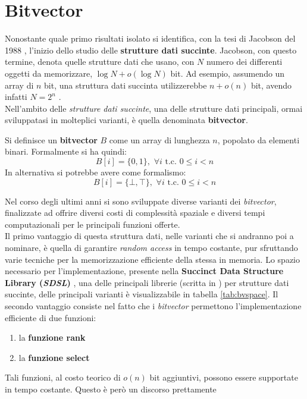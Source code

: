 \section{Bitvector}
\label{bvsec}
Nonostante quale primo risultati isolato si identifica, con la tesi di Jacobson
del 1988 \cite{succinct}, l'inizio dello studio delle \textbf{strutture dati
  succinte}. Jacobson, con questo termine, denota quelle strutture dati che
usano, con $N$ numero dei differenti oggetti da memorizzare, $\log N+o(\log N)$
bit. Ad esempio, assumendo un array di $n$ bit, una struttura dati succinta
utilizzerebbe $n+o(n)$ bit, avendo infatti $N=2^n$ \cite{navarro}.\\
Nell'ambito delle \textit{strutture dati succinte}, una delle strutture dati
principali, ormai sviluppatasi in molteplici varianti, è quella denominata
\textbf{bitvector}.
\begin{definizione}
  Si definisce un \textbf{bitvector} $B$ come un array di lunghezza $n$,
  popolato da elementi binari. Formalmente si ha quindi:
  \[B[i]=\{0,1\},\,\,\forall i \mbox{ t.c. } 0\leq i < n\]
  In alternativa si potrebbe avere come formalismo:
  \[B[i]=\{\bot,\top\},\,\,\forall i \mbox{ t.c. } 0\leq i < n\]
\end{definizione}
Nel corso degli ultimi anni si sono sviluppate diverse varianti dei
\textit{bitvector}, finalizzate ad offrire diversi costi di complessità spaziale
e 
diversi tempi computazionali per le principali funzioni offerte.\\
Il primo vantaggio di questa struttura dati, nelle varianti che si andranno poi
a nominare, è quella di garantire \textit{random access} in tempo costante, pur
sfruttando varie tecniche per la memorizzazione efficiente della stessa in
memoria. Lo spazio necessario per l'implementazione, presente nella
\textbf{Succinct Data Structure Library (\textit{SDSL})} \cite{sdsl}, una delle
  principali librerie (scritta in ) per strutture dati succinte,
  delle principali varianti è visualizzabile in tabella 
\ref{tab:bvspace}. Il secondo vantaggio consiste nel fatto che i
\textit{bitvector} permettono l'implementazione efficiente di due funzioni: 
\begin{enumerate}
  \item la \textbf{funzione rank}
  \item la \textbf{funzione select}
\end{enumerate}
Tali funzioni, al costo teorico di $o(n)$ bit aggiuntivi, possono
essere supportate in tempo costante. Questo è però un discorso prettamente
